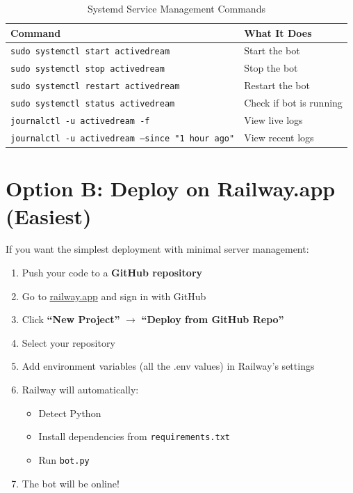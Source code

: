 \begin{table}[H]
\centering
\caption{Systemd Service Management Commands}
\begin{tabularx}{\textwidth}{|l|X|}
\hline
\textbf{Command} & \textbf{What It Does} \\
\hline
\texttt{sudo systemctl start activedream} & Start the bot \\
\hline
\texttt{sudo systemctl stop activedream} & Stop the bot \\
\hline
\texttt{sudo systemctl restart activedream} & Restart the bot \\
\hline
\texttt{sudo systemctl status activedream} & Check if bot is running \\
\hline
\texttt{journalctl -u activedream -f} & View live logs \\
\hline
\texttt{journalctl -u activedream --since "1 hour ago"} & View recent logs \\
\hline
\end{tabularx}
\end{table}

\section{Option B: Deploy on Railway.app (Easiest)}

If you want the simplest deployment with minimal server management:

\begin{enumerate}
    \item Push your code to a \textbf{GitHub repository}
    \item Go to \href{https://railway.app}{railway.app} and sign in with GitHub
    \item Click \textbf{``New Project''} $\rightarrow$ \textbf{``Deploy from GitHub Repo''}
    \item Select your repository
    \item Add environment variables (all the .env values) in Railway's settings
    \item Railway will automatically:
    \begin{itemize}
        \item Detect Python
        \item Install dependencies from \texttt{requirements.txt}
        \item Run \texttt{bot.py}
    \end{itemize}
    \item The bot will be online!
\end{enumerate}

